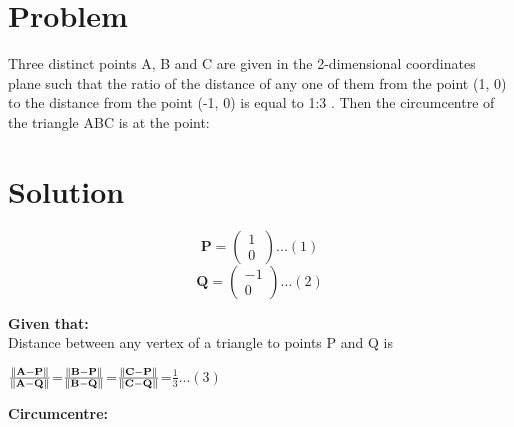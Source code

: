 \documentclass[10pt, a4paper]{article}
\let\vec\mathbf
\begin{document}
\title{\mytitle}
\author{\myauthor\hspace{1em}\\\contact\\FWC22045\hspace{6.5em}IITH\hspace{0.5em}\mymodule\hspace{6em}Matrix:Lines}

\date{}
\maketitle


  \section{Problem}
Three distinct points A, B and C are given in the 2-dimensional coordinates plane such that the ratio of the distance of any one of them from the point (1, 0) to the distance from the point (-1, 0) is equal to 1:3 . Then the circumcentre of the triangle ABC is at the point:

\section{Solution}
\begin{center}


$$\vec{P}=\begin{pmatrix} 1\\ 0\ \end{pmatrix} ...(1)$$
$$\vec{Q}=\begin{pmatrix} -1\\ 0\ \end{pmatrix} ...(2)$$
\end{center}

\textbf{Given that:}
\\
Distance between any vertex of a triangle to points P and Q is
\\
\begin{center}
$\frac{\norm{\vec{A-P}}}{\norm{\vec{A-Q}}}$=$\frac{\norm{\vec{B-P}}}{\norm{\vec{B-Q}}}$=$\frac{\norm{\vec{C-P}}}{\norm{\vec{C-Q}}}$=$\frac{1}{3} ...(3)$
\end{center}

\textbf{Circumcentre:} \\
\end{document}
